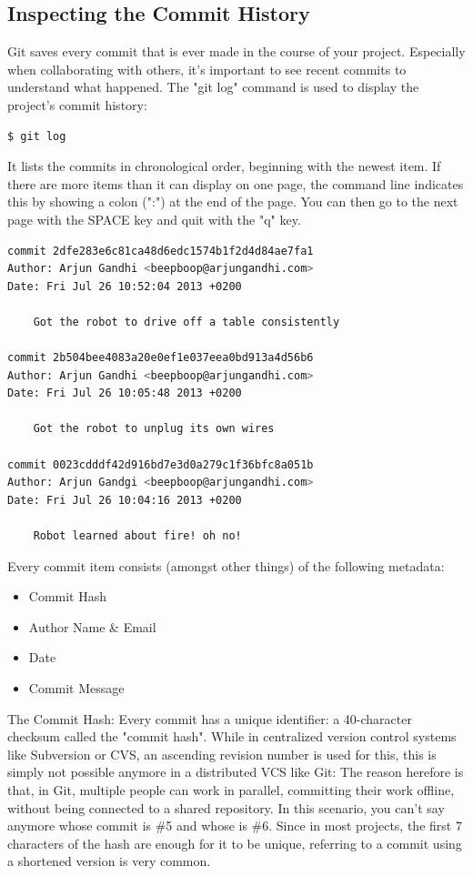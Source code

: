 \documentclass{article}
\begin{document}
\subsection{Inspecting the Commit History}
Git saves every commit that is ever made in the course of your project. Especially when collaborating with others, it's important to see recent commits to understand what happened.
\newline\newline
The "git log" command is used to display the project's commit history:
\begin{lstlisting}[language=bash]
$ git log
\end{lstlisting}
It lists the commits in chronological order, beginning with the newest item. If there are more items than it can display on one page, the command line indicates this by showing a colon (":") at the end of the page. You can then go to the next page with the SPACE key and quit with the "q" key.
\begin{lstlisting}[language=bash]
commit 2dfe283e6c81ca48d6edc1574b1f2d4d84ae7fa1
Author: Arjun Gandhi <beepboop@arjungandhi.com>
Date: Fri Jul 26 10:52:04 2013 +0200

    Got the robot to drive off a table consistently

commit 2b504bee4083a20e0ef1e037eea0bd913a4d56b6
Author: Arjun Gandhi <beepboop@arjungandhi.com>
Date: Fri Jul 26 10:05:48 2013 +0200

    Got the robot to unplug its own wires

commit 0023cdddf42d916bd7e3d0a279c1f36bfc8a051b
Author: Arjun Gandgi <beepboop@arjungandhi.com>
Date: Fri Jul 26 10:04:16 2013 +0200

    Robot learned about fire! oh no!
\end{lstlisting}

Every commit item consists (amongst other things) of the following metadata:
\begin{itemize}
    \item Commit Hash
    \item Author Name \& Email
    \item Date
    \item Commit Message
\end{itemize}
 \begin{definition}The Commit Hash:
 \newline\newline
Every commit has a unique identifier: a 40-character checksum called the "commit hash". While in centralized version control systems like Subversion or CVS, an ascending revision number is used for this, this is simply not possible anymore in a distributed VCS like Git: The reason herefore is that, in Git, multiple people can work in parallel, committing their work offline, without being connected to a shared repository. In this scenario, you can't say anymore whose commit is \#5 and whose is \#6.
 \newline\newline
Since in most projects, the first 7 characters of the hash are enough for it to be unique, referring to a commit using a shortened version is very common.
 \end{definition}
\end{document}
